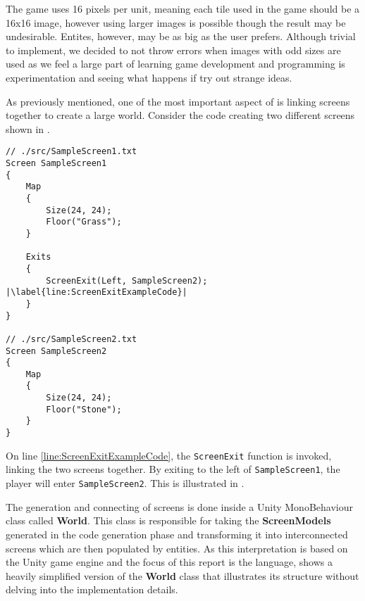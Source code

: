 

The game uses 16 pixels per unit, meaning each tile used in the game should be a 16x16 image, however using larger images is possible though the result may be undesirable. Entites, however, may be as big as the user prefers. 
Although trivial to implement, we decided to not throw errors when images with odd sizes are used as we feel a large part of learning game development and programming is experimentation and seeing what happens if try out strange ideas.


As previously mentioned, one of the most important aspect of \dazel{} is linking screens together to create a large world. Consider the code creating two different screens shown in .

\begin{lstlisting}[language=CSharp, caption={}, label={lst:DazelScreenExit},escapechar=|]
// ./src/SampleScreen1.txt
Screen SampleScreen1 
{
	Map 
	{
		Size(24, 24);
		Floor("Grass");
	}

	Exits
	{
		ScreenExit(Left, SampleScreen2); |\label{line:ScreenExitExampleCode}|
	}
}

// ./src/SampleScreen2.txt
Screen SampleScreen2
{
	Map 
	{
		Size(24, 24);
		Floor("Stone");
	}
}
\end{lstlisting}

On line \ref{line:ScreenExitExampleCode}, the \texttt{ScreenExit} function is invoked, linking the two screens together.
By exiting to the left of \texttt{SampleScreen1}, the player will enter \texttt{SampleScreen2}.
This is illustrated in .


The generation and connecting of screens is done inside a Unity MonoBehaviour class called \textbf{World}.
This class is responsible for taking the \textbf{ScreenModels} generated in the code generation phase and transforming it into interconnected screens which are then populated by entities. 
As this interpretation is based on the Unity game engine and the focus of this report is the \dazel{} language, 
 shows a heavily simplified version of the \textbf{World} class that illustrates its structure without delving into the implementation details.

